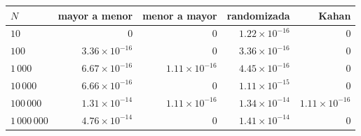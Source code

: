 \begin{tabular}{lrrrr}
\toprule
$N$ & mayor a menor & menor a mayor & randomizada & Kahan \\
\midrule
$10$ & $0$ & $0$ & $1.22 \times 10^{-16}$ & $0$ \\
$100$ & $3.36 \times 10^{-16}$ & $0$ & $3.36 \times 10^{-16}$ & $0$ \\
$1\,000$ & $6.67 \times 10^{-16}$ & $1.11 \times 10^{-16}$ & $4.45 \times 10^{-16}$ & $0$ \\
$10\,000$ & $6.66 \times 10^{-16}$ & $0$ & $1.11 \times 10^{-15}$ & $0$ \\
$100\,000$ & $1.31 \times 10^{-14}$ & $1.11 \times 10^{-16}$ & $1.34 \times 10^{-14}$ & $1.11 \times 10^{-16}$ \\
$1\,000\,000$ & $4.76 \times 10^{-14}$ & $0$ & $1.41 \times 10^{-14}$ & $0$ \\
\bottomrule
\end{tabular}
